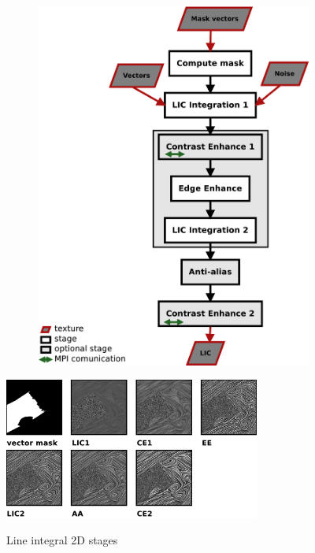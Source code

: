 \documentclass[a4paper,10pt]{article}
\begin{document}
\begin{figure}[ht]
\begin{subfigure}{0.4\textwidth}
		\includegraphics[width=\textwidth]{./images-data/dia-serial/lic2d-flow.png}
		\caption{}
		\label{fig:lic2d-flow}
	\end{subfigure}
\end{figure}

\begin{figure}[ht]
	\centering
	\includegraphics[width=0.75\textwidth]{./images-data/dia-serial/lg-lic2d-200ppi.png}
	\label{fig:lic2d-outputs}
  \caption{Line integral 2D stages}
\end{figure}
\end{document}
